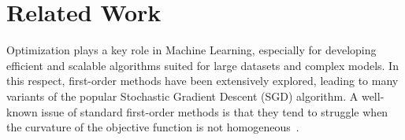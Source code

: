 \documentclass[conference]{IEEEtran}
\begin{document}


\section{Related Work}
\label{sec:rel_work}

Optimization plays a key role in Machine Learning, especially for developing efficient and scalable algorithms suited for large datasets and complex models. In this respect, first-order methods have been extensively explored, leading to many variants of the popular Stochastic Gradient Descent (SGD) algorithm. A well-known issue of standard first-order methods is that they tend to struggle when the curvature of the objective function is not homogeneous~\cite{sutton_two_1986}. 

\end{document}
